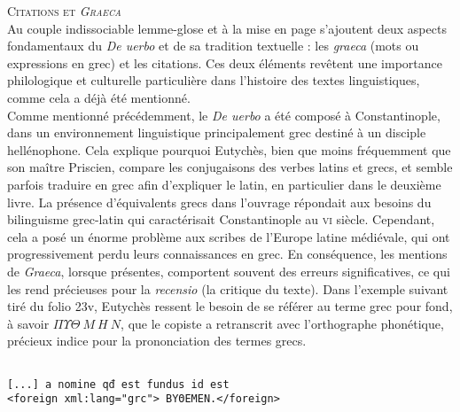 \documentclass[a4paper, twoside, 12pt]{book}
\begin{document}
\textsc{Citations et \textit{Graeca}}\\

Au couple indissociable lemme-glose et à la mise en page s'ajoutent deux aspects fondamentaux du \textit{De uerbo} et de sa tradition textuelle : les \textit{graeca} (mots ou expressions en grec) et les citations. Ces deux éléments revêtent une importance philologique et culturelle particulière dans l'histoire des textes linguistiques, comme cela a déjà été mentionné.\\ 

Comme mentionné précédemment, le \textit{De uerbo} a été composé à Constantinople, dans un environnement linguistique principalement grec destiné à un disciple hellénophone. Cela explique pourquoi Eutychès, bien que moins fréquemment que son maître Priscien, compare les conjugaisons des verbes latins et grecs, et semble parfois traduire en grec afin d'expliquer le latin, en particulier dans le deuxième livre. La présence d'équivalents grecs dans l'ouvrage répondait aux besoins du bilinguisme grec-latin qui caractérisait Constantinople au \textsc{vi}\ieme{} siècle. Cependant, cela a posé un énorme problème aux scribes de l'Europe latine médiévale, qui ont progressivement perdu leurs connaissances en grec. En conséquence, les mentions de \textit{Graeca}, lorsque présentes, comportent souvent des erreurs significatives, ce qui les rend précieuses pour la \textit{recensio} (la critique du texte). Dans l'exemple suivant tiré du folio 23v, Eutychès ressent le besoin de se référer au terme grec pour \og{}fond\fg{}, à savoir $\Pi \Upsilon \Theta \ M \ H \ N $, que le copiste a retranscrit avec l'orthographe phonétique, précieux indice pour la prononciation des termes grecs. \\ 

\begin{verbatim}

[...] a nomine qđ est fundus id est 
<foreign xml:lang="grc"> ΒΥΘΕΜΕΝ.</foreign>

\end{verbatim} 
\end{document}
